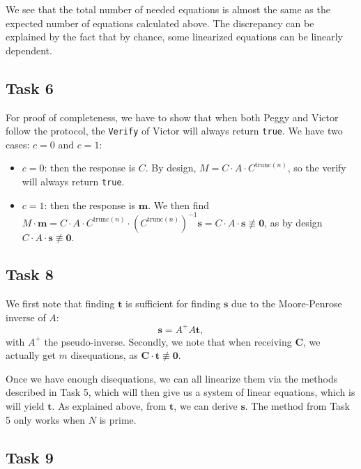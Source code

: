 \documentclass{article}
\begin{document}
We see that the total number of needed equations is almost the same as the
expected number of equations calculated above. The discrepancy can be explained
by the fact that by chance, some linearized equations can be linearly dependent.

\subsection*{Task 6}

For proof of completeness, we have to show that when both Peggy and Victor
follow the protocol, the \texttt{Verify} of Victor will always return
\texttt{true}. We have two cases: $c = 0$ and $c = 1$: 
 \begin{itemize}
   \item $c = 0$: then the response is $C$. By design, $M = C \cdot A \cdot
     C^{\text{trunc}(n)}$, so the verify will always return  \texttt{true}.
   \item $c = 1$: then the response is $\mathbf{m}$. We then find $M
     \cdot\mathbf{m} = C \cdot A \cdot C^{\text{trunc}(n)} \cdot \left(
     C^{\text{trunc}(n)} \right)^{-1} \mathbf{s} = C \cdot A \cdot \mathbf{s}
     \not\equiv \mathbf{0}$, as by design $C \cdot A \cdot \mathbf{s} \not\equiv
     \mathbf{0}.$
\end{itemize}

\subsection*{Task 8}

We first note that finding $\mathbf{t}$ is sufficient for finding $\mathbf{s}$
due to the Moore-Penrose inverse of $A$: 
\begin{equation}
  \mathbf{s} = A^+ A \mathbf{t},
\end{equation} 
with $A^+$ the pseudo-inverse. Secondly, we note that when receiving
$\mathbf{C}$, we actually get $m$ disequations, as $\mathbf{C} \cdot \mathbf{t}
\not\equiv \mathbf{0}$. 

Once we have enough disequations, we can all linearize them via the methods
described in Task 5, which will then give us a system of linear equations, which
is will yield $\mathbf{t}.$ As explained above, from  $\mathbf{t}$, we can
derive $\mathbf{s}$. The method from Task 5 only works when $N$ is prime.

\subsection*{Task 9}

\printbibliography
\end{document}
